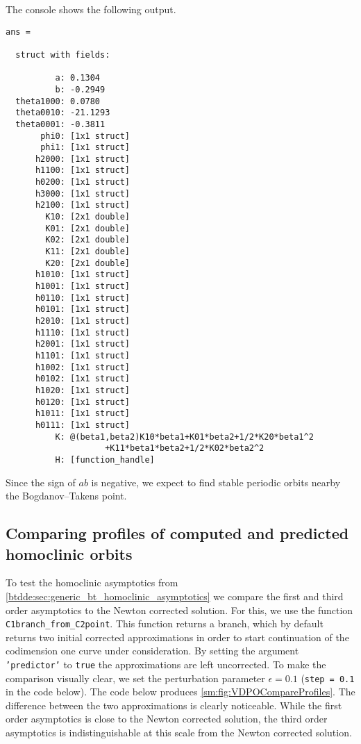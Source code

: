 The \MATLAB console shows the following output.
\begin{verbatim}
ans =

  struct with fields:

          a: 0.1304
          b: -0.2949
  theta1000: 0.0780
  theta0010: -21.1293
  theta0001: -0.3811
       phi0: [1x1 struct]
       phi1: [1x1 struct]
      h2000: [1x1 struct]
      h1100: [1x1 struct]
      h0200: [1x1 struct]
      h3000: [1x1 struct]
      h2100: [1x1 struct]
        K10: [2x1 double]
        K01: [2x1 double]
        K02: [2x1 double]
        K11: [2x1 double]
        K20: [2x1 double]
      h1010: [1x1 struct]
      h1001: [1x1 struct]
      h0110: [1x1 struct]
      h0101: [1x1 struct]
      h2010: [1x1 struct]
      h1110: [1x1 struct]
      h2001: [1x1 struct]
      h1101: [1x1 struct]
      h1002: [1x1 struct]
      h0102: [1x1 struct]
      h1020: [1x1 struct]
      h0120: [1x1 struct]
      h1011: [1x1 struct]
      h0111: [1x1 struct]
          K: @(beta1,beta2)K10*beta1+K01*beta2+1/2*K20*beta1^2
                    +K11*beta1*beta2+1/2*K02*beta2^2
          H: [function_handle]
\end{verbatim}
Since the sign of $ab$ is negative, we expect to find stable periodic orbits nearby the 
Bogdanov--Takens point.

\subsection{Comparing profiles of computed and predicted homoclinic orbits}
To test the homoclinic asymptotics from
\cref{btdde:sec:generic_bt_homoclinic_asymptotics} we compare the first and third
order asymptotics to the Newton corrected solution. For this, we use the 
function \texttt{C1branch_from_C2point}. This function returns a branch, which
by default returns two initial corrected approximations in order to start continuation of the
codimension one curve under consideration. By setting the argument
\texttt{'predictor'} to \texttt{true} the approximations are left uncorrected.
To make the comparison visually clear, we set the perturbation parameter 
$\epsilon=0.1$ (\texttt{step = 0.1} in the code below).
The code below produces \cref{sm:fig:VDPOCompareProfiles}.
The difference between the two approximations is clearly noticeable. While
the first order asymptotics is close to the Newton corrected solution, the third
order asymptotics is indistinguishable at this scale from the Newton corrected
solution.
\inputminted[firstline=63, lastline=87]{MATLAB}{\pathToDDEBifToolDemos/vdpo_bt_transcritical/vanderPolOscillator.m}


